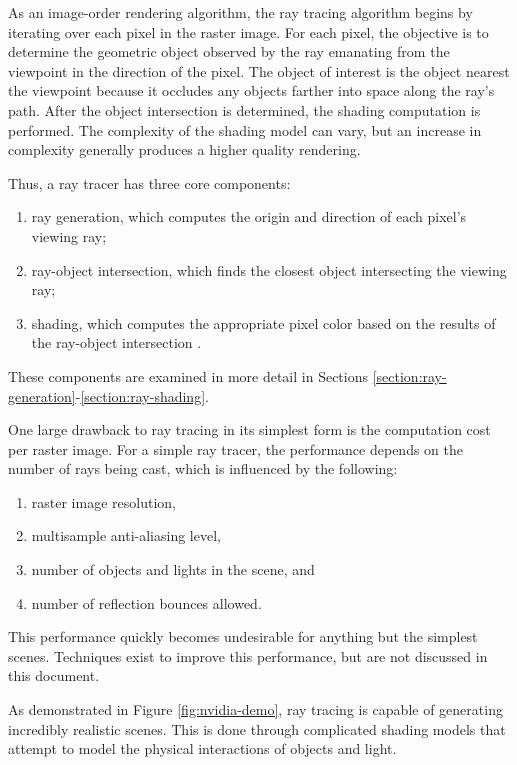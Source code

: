 \documentclass[letterpaper, 11pt, onecolumn, oneside]{article}
\begin{document}
As an image-order rendering algorithm, the ray tracing algorithm begins by iterating over each pixel in the raster image.
For each pixel, the objective is to determine the geometric object observed by the ray emanating from the viewpoint in the direction of the pixel.
The object of interest is the object nearest the viewpoint because it occludes any objects farther into space along the ray's path.
After the object intersection is determined, the shading computation is performed.
The complexity of the shading model can vary, but an increase in complexity generally produces a higher quality rendering.

Thus, a ray tracer has three core components:
\begin{enumerate}
    \item ray generation, which computes the origin and direction of each pixel's viewing ray;
    \item ray-object intersection, which finds the closest object intersecting the viewing ray;
    \item shading, which computes the appropriate pixel color based on the results of the ray-object intersection \cite{stevemarschner2015}.
\end{enumerate}
These components are examined in more detail in Sections \ref{section:ray-generation}-\ref{section:ray-shading}.

One large drawback to ray tracing in its simplest form is the computation cost per raster image.
For a simple ray tracer, the performance depends on the number of rays being cast, which is influenced by the following:
\begin{enumerate}
    \item raster image resolution,
    \item multisample anti-aliasing level,
    \item number of objects and lights in the scene, and
    \item number of reflection bounces allowed.
\end{enumerate}
This performance quickly becomes undesirable for anything but the simplest scenes.
Techniques exist to improve this performance, but are not discussed in this document.

As demonstrated in Figure \ref{fig:nvidia-demo}, ray tracing is capable of generating incredibly realistic scenes.
This is done through complicated shading models that attempt to model the physical interactions of objects and light.
\end{document}
